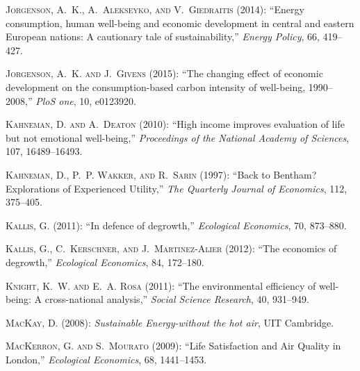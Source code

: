 \documentclass[10pt, letterpaper]{article}
\begin{document}
\begin{spacing}{1.0}
\begin{thebibliography}{49}
\textsc{Jorgenson, A.~K., A.~Alekseyko, and V.~Giedraitis} (2014):
  \enquote{Energy consumption, human well-being and economic development in
  central and eastern European nations: A cautionary tale of sustainability,}
  \emph{Energy Policy}, 66, 419--427.

\textsc{Jorgenson, A.~K. and J.~Givens} (2015): \enquote{The changing effect of
  economic development on the consumption-based carbon intensity of well-being,
  1990--2008,} \emph{PloS one}, 10, e0123920.

\textsc{Kahneman, D. and A.~Deaton} (2010): \enquote{High income improves
  evaluation of life but not emotional well-being,} \emph{Proceedings of the
  National Academy of Sciences}, 107, 16489--16493.

\textsc{Kahneman, D., P.~P. Wakker, and R.~Sarin} (1997): \enquote{Back to
  Bentham? {E}xplorations of Experienced Utility,} \emph{The Quarterly Journal
  of Economics}, 112, 375--405.

\textsc{Kallis, G.} (2011): \enquote{In defence of degrowth,} \emph{Ecological
  Economics}, 70, 873--880.

\textsc{Kallis, G., C.~Kerschner, and J.~Martinez-Alier} (2012): \enquote{The
  economics of degrowth,} \emph{Ecological Economics}, 84, 172--180.

\textsc{Knight, K.~W. and E.~A. Rosa} (2011): \enquote{The environmental
  efficiency of well-being: A cross-national analysis,} \emph{Social Science
  Research}, 40, 931--949.

\textsc{MacKay, D.} (2008): \emph{Sustainable Energy-without the hot air}, UIT
  Cambridge.

\textsc{MacKerron, G. and S.~Mourato} (2009): \enquote{Life Satisfaction and
  Air Quality in London,} \emph{Ecological Economics}, 68, 1441--1453.


\end{thebibliography}
\end{spacing}
\end{document}

